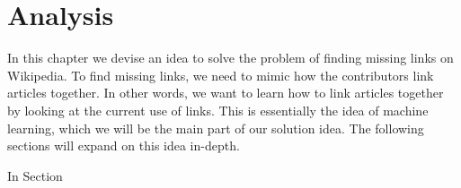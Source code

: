 \chapter{Analysis}\label{chap:analysis}
In this chapter we devise an idea to solve the problem of finding missing links on Wikipedia. 
To find missing links, we need to mimic how the contributors link articles together. In other words, we want to learn how to link articles together by looking at the current use of links. This is essentially the idea of machine learning, which we will be the main part of our solution idea. The following sections will expand on this idea in-depth.

\begin{chapterorganization}
  \item In Section
 
\end{chapterorganization}






